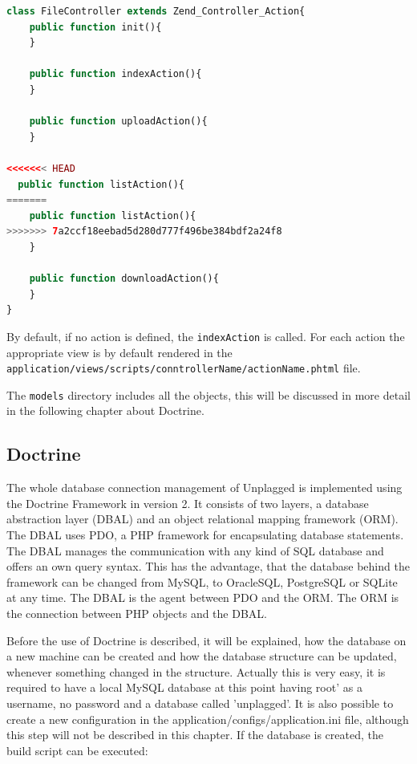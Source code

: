 \begin{lstlisting}[caption=Persisting an object to the database in Doctrine, label=list:persistingObjectDoctrine, language=PHP]
class FileController extends Zend_Controller_Action{
	public function init(){
	}

	public function indexAction(){
	}

	public function uploadAction(){
	}

<<<<<<< HEAD
  public function listAction(){
=======
	public function listAction(){
>>>>>>> 7a2ccf18eebad5d280d777f496be384bdf2a24f8
	}
  	
	public function downloadAction(){
	}
}
\end{lstlisting}

By default, if no action is defined, the \texttt{indexAction} is called. For each action the appropriate view is by 
default rendered in the \texttt{\nolinkurl{application/views/scripts/conntrollerName/actionName.phtml}} file.

The \texttt{models} directory includes all the objects, this will be discussed in more detail in the following chapter about Doctrine.

\subsection{Doctrine}
The whole database connection management of Unplagged is implemented using the Doctrine Framework in version 2. 
It consists of two layers, a database abstraction layer (DBAL) and an object relational mapping framework
(ORM). The DBAL uses PDO, a PHP framework for encapsulating database statements. The DBAL manages the
communication with any kind of SQL database and offers an own query syntax. This has the advantage, that
the database behind the framework can be changed from MySQL, to OracleSQL, PostgreSQL or SQLite at any time.
The DBAL is the agent between PDO and the ORM. The ORM is the connection between PHP objects and the DBAL.

Before the use of Doctrine is described, it will be explained, how the database on a new machine can be created 
and how the database structure can be updated, whenever something changed in the structure. Actually this is very easy, 
it is required to have a local MySQL database at this point having root' as a username, no password and a database 
called 'unplagged'. It is also possible to create a new configuration in the 
application/configs/application.ini file, although this step will not be described in this chapter. If the database is 
created, the build script can be executed:


